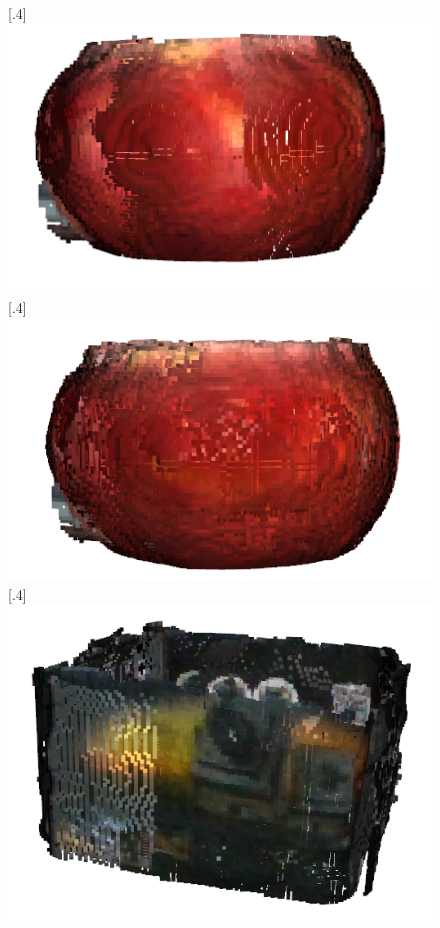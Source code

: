 \begin{figure}[H]
\centering
{}%
  [.4\linewidth]{\includegraphics[scale=0.7]{jablko_45_pt.PNG}}
  [.4\linewidth]{\includegraphics[scale=0.7]{jablko_1125_pt.PNG}}
  [.4\linewidth]{\includegraphics[scale=0.5]{box_global_45_pt.PNG}}

\end{figure}
